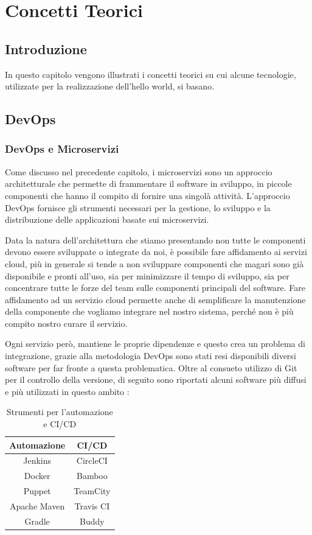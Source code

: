 \chapter{Concetti Teorici}
\section{Introduzione}
In questo capitolo vengono illustrati i concetti teorici su cui alcune tecnologie, utilizzate per la realizzazione dell'hello world, si basano.

\section{DevOps}
\subsection{DevOps e Microservizi}
Come discusso nel precedente capitolo, i microservizi sono un approccio architetturale che permette di frammentare il software in sviluppo, in piccole componenti che hanno il compito di fornire una singolà attività. L'approccio DevOps \cite{7458761} fornisce gli strumenti necessari per la gestione, lo sviluppo e la distribuzione delle applicazioni basate sui microservizi.

Data la natura dell'architettura che stiamo presentando non tutte le componenti devono essere sviluppate o integrate da noi, è possibile fare affidamento ai servizi cloud, più in generale si tende a non sviluppare componenti che magari sono già disponibile e pronti all'uso, sia per minimizzare il tempo di sviluppo, sia per concentrare tutte le forze del team sulle componenti principali del software. Fare affidamento ad un servizio cloud permette anche di semplificare la manutenzione della componente che vogliamo integrare nel nostro sistema, perché non è più compito nostro curare il servizio.

Ogni servizio però, mantiene le proprie dipendenze e questo crea un problema di integrazione, grazie alla metodologia DevOps sono stati resi disponibili diversi software per far fronte a questa problematica. Oltre al consueto utilizzo di Git per il controllo della versione, di seguito sono riportati alcuni software più diffusi e più utilizzati in questo ambito \cite{Strumenti_di_DevOps}:

\begin{table}[h]
    \centering
     \begin{tabular}{| c | c |} 
     \hline
     Automazione & \ac*{CI/CD}\\ [0.5ex]
     \hline
     Jenkins & CircleCI \\
     Docker & Bamboo \\
     Puppet & TeamCity \\
     Apache Maven & Travis CI \\
     Gradle & Buddy \\
     \hline
     \end{tabular}
    \caption{Strumenti per l'automazione e CI/CD}
    \label{tab:table1}
\end{table}

